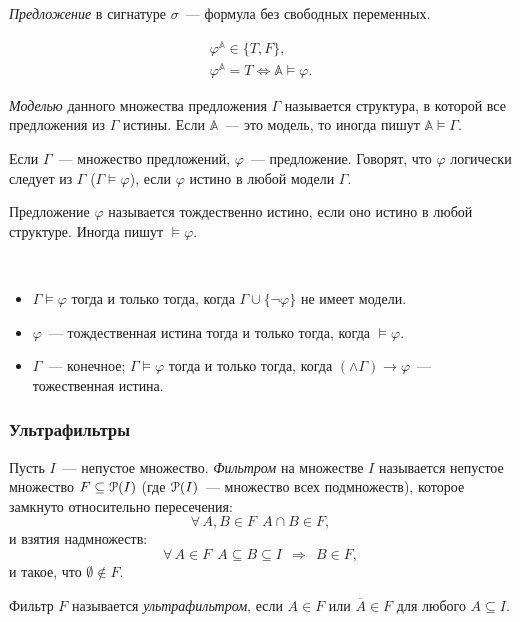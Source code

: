 \begin{definition}
    \textit{Предложение} в сигнатуре $\sigma$~— формула без свободных переменных.  

    \begin{equation*}
        \begin{aligned}
            \varphi^{\mathbb{A}} \in \{T, F\}, \\ 
            \varphi^{\mathbb{A}} = T \Longleftrightarrow \mathbb{A} \models \varphi.
        \end{aligned}
    \end{equation*}
\end{definition}

\begin{definition} 
    \textit{Моделью} данного множества предложения $\Gamma$ называется структура, в которой все предложения из $\Gamma$ истины. Если $\mathbb{A}$~— это модель, то иногда пишут $\mathbb{A} \models \Gamma$. 

    Если $\Gamma$~— множество предложений, $\varphi$~— предложение. Говорят, что $\varphi$ логически следует из $\Gamma$ ($\Gamma \models \varphi$), если $\varphi$ истино в любой модели $\Gamma$. 
\end{definition} 

\begin{definition}
    Предложение $\varphi$ называется тождественно истино, если оно истино в любой структуре. Иногда пишут $\models \varphi$. 
\end{definition}

\begin{stat} \ 
    \begin{itemize}
        \item $\Gamma \models \varphi$ тогда и только тогда, когда $\Gamma \cup \{\neg \varphi\}$ не имеет модели. 
        \item $\varphi$~— тождественная истина тогда и только тогда, когда $\models \varphi$. 
        \item $\Gamma$~— конечное; $\Gamma \models \varphi$ тогда и только тогда, когда $(\wedge \Gamma) \to \varphi$~— тожественная истина.
    \end{itemize}
\end{stat} 

\subsubsection{Ультрафильтры}

\begin{definition}
    Пусть $I$~— непустое множество. \textit{Фильтром} на множестве $I$ называется непустое множество $F \subseteq \operatorname{{\EuScript{P}}}(I)$ (где $\operatorname{{\EuScript{P}}}(I)$~— множество всех подмножеств), которое замкнуто относительно пересечения:
    \[\forall\,A, B \in F\ \ A\cap B \in F,\]
и взятия надмножеств:
    \[\forall\,A \in F\ \ A \subseteq B \subseteq I\ \ \Longrightarrow\ \ B \in F,\]
и такое, что $\emptyset \notin F$.  

    Фильтр $F$ называется \textit{ультрафильтром}, если $A \in F$ или $\overline{A} \in F$ для любого $A \subseteq I$. 
\end{definition} 

